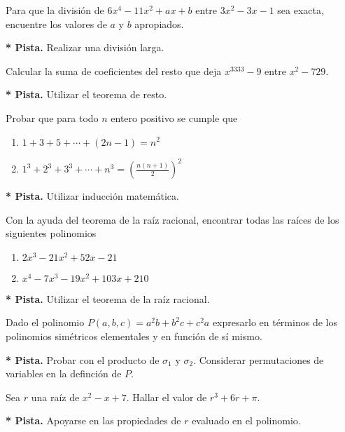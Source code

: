 \begin{exercise}
    Para que la división de $6x^4 - 11x^2 + ax + b$ entre $3x^2 - 3x - 1$ sea exacta, encuentre los valores de $a$ y $b$ apropiados.
\end{exercise}
\textbf{* Pista.} Realizar una división larga.


\begin{exercise}
    Calcular la suma de coeficientes del resto que deja $x^{3333} - 9$ entre $x^2 - 729$.
\end{exercise}
\textbf{* Pista.} Utilizar el teorema de resto.


\begin{exercise}
    Probar que para todo $n$ entero positivo se cumple que
    \begin{enumerate}
        \item $1 + 3 + 5 + \cdots + \left(2n - 1\right) = n^2$
        \item $1^3 + 2^3 + 3^3  + \cdots + n^3 = \left(\frac{n (n + 1)}{2}\right)^2$
    \end{enumerate}
\end{exercise}
\textbf{* Pista.} Utilizar inducción matemática.


\begin{exercise}
    Con la ayuda del teorema de la raíz racional, encontrar todas las raíces de los siguientes polinomios
    \begin{enumerate}
        \item $2 x^3 - 21 x^2 + 52 x - 21$
        \item $x^4 - 7 x^3 - 19 x^2 + 103 x + 210$
    \end{enumerate}
\end{exercise}
\textbf{* Pista.} Utilizar el teorema de la raíz racional.


\begin{exercise}
    Dado el polinomio $P(a,b, c) = a^2 b + b^2 c + c^2 a$ expresarlo en términos de los polinomios simétricos elementales y en función de sí mismo.
\end{exercise}
\textbf{* Pista.} Probar con el producto de $\sigma_1$ y $\sigma_2$.
Considerar permutaciones de variables en la definción de $P$.

\begin{problem}
    Sea $r$ una raíz de $x^2 - x + 7$.
    Hallar el valor de $r^3 + 6r + \pi$.
\end{problem}
\textbf{* Pista.} Apoyarse en las propiedades de $r$ evaluado en el polinomio.


